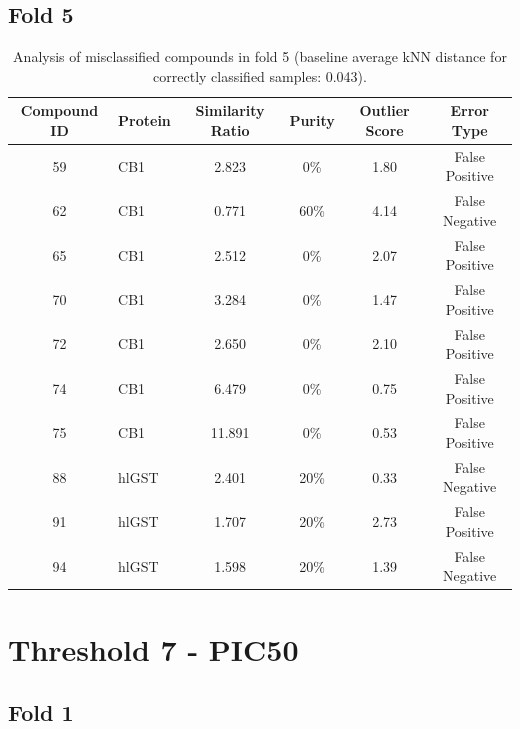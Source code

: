 \documentclass{article}
\newenvironment{smarttabular}[1]{%
    \begin{tabular}{#1}%
}{%
    \end{tabular}%
}
\begin{document}
\clearpage

\subsection{Fold 5}

\begin{table}[H]
    \centering
    \small
    \caption{Analysis of misclassified compounds in fold 5 (baseline average kNN distance for correctly classified samples: 0.043).}
    \label{tab:misclassified_compounds_5}
    \begin{smarttabular}{clcccc}
        \toprule
        \textbf{Compound ID} & \textbf{Protein} & \textbf{Similarity Ratio} & \textbf{Purity} & \textbf{Outlier Score} & \textbf{Error Type} \\
        \midrule
        59 & CB1 & 2.823 & 0\% & 1.80 & False Positive \\
        62 & CB1 & 0.771 & 60\% & 4.14 & False Negative \\
        65 & CB1 & 2.512 & 0\% & 2.07 & False Positive \\
        70 & CB1 & 3.284 & 0\% & 1.47 & False Positive \\
        72 & CB1 & 2.650 & 0\% & 2.10 & False Positive \\
        74 & CB1 & 6.479 & 0\% & 0.75 & False Positive \\
        75 & CB1 & 11.891 & 0\% & 0.53 & False Positive \\
        88 & hlGST & 2.401 & 20\% & 0.33 & False Negative \\
        91 & hlGST & 1.707 & 20\% & 2.73 & False Positive \\
        94 & hlGST & 1.598 & 20\% & 1.39 & False Negative \\
        \bottomrule
    \end{smarttabular}
\end{table}

\clearpage

\section{Threshold 7 - PIC50}

\subsection{Fold 1}
\end{document}
